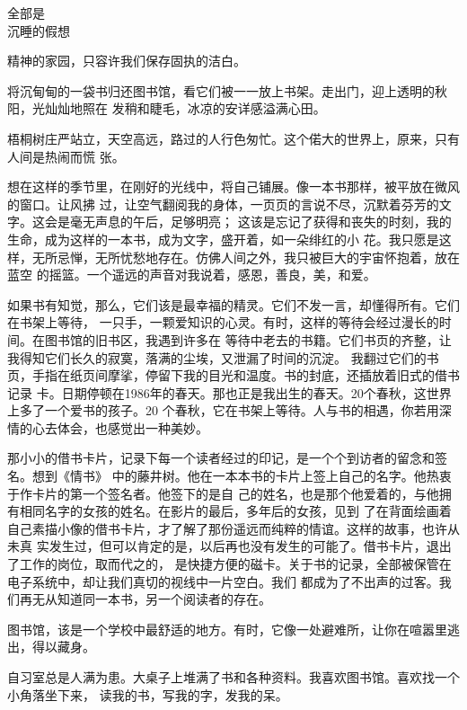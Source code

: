 		全部是 \\
		沉睡的假想

	\endlongpoem
	\endwriting



		精神的家园，只容许我们保存固执的洁白。

		将沉甸甸的一袋书归还图书馆，看它们被一一放上书架。走出门，迎上透明的秋阳，光灿灿地照在
	发稍和睫毛，冰凉的安详感溢满心田。

		梧桐树庄严站立，天空高远，路过的人行色匆忙。这个偌大的世界上，原来，只有人间是热闹而慌
	张。

		想在这样的季节里，在刚好的光线中，将自己铺展。像一本书那样，被平放在微风的窗口。让风拂
	过，让空气翻阅我的身体，一页页的言说不尽，沉默着芬芳的文字。这会是毫无声息的午后，足够明亮；
	这该是忘记了获得和丧失的时刻，我的生命，成为这样的一本书，成为文字，盛开着，如一朵绯红的小
	花。我只愿是这样，无所忌惮，无所忧愁地存在。仿佛人间之外，我只被巨大的宇宙怀抱着，放在蓝空
	的摇篮。一个遥远的声音对我说着，感恩，善良，美，和爱。

		如果书有知觉，那么，它们该是最幸福的精灵。它们不发一言，却懂得所有。它们在书架上等待，
	一只手，一颗爱知识的心灵。有时，这样的等待会经过漫长的时间。在图书馆的旧书区，我遇到许多在
	等待中老去的书籍。它们书页的齐整，让我得知它们长久的寂寞，落满的尘埃，又泄漏了时间的沉淀。
	我翻过它们的书页，手指在纸页间摩挲，停留下我的目光和温度。书的封底，还插放着旧式的借书记录
	卡。日期停顿在1986年的春天。那也正是我出生的春天。20个春秋，这世界上多了一个爱书的孩子。20
	个春秋，它在书架上等待。人与书的相遇，你若用深情的心去体会，也感觉出一种美妙。

		那小小的借书卡片，记录下每一个读者经过的印记，是一个个到访者的留念和签名。想到《情书》
	中的藤井树。他在一本本书的卡片上签上自己的名字。他热衷于作卡片的第一个签名者。他签下的是自
	己的姓名，也是那个他爱着的，与他拥有相同名字的女孩的姓名。在影片的最后，多年后的女孩，见到
	了在背面绘画着自己素描小像的借书卡片，才了解了那份遥远而纯粹的情谊。这样的故事，也许从未真
	实发生过，但可以肯定的是，以后再也没有发生的可能了。借书卡片，退出了工作的岗位，取而代之的，
	是快捷方便的磁卡。关于书的记录，全部被保管在电子系统中，却让我们真切的视线中一片空白。我们
	都成为了不出声的过客。我们再无从知道同一本书，另一个阅读者的存在。

		图书馆，该是一个学校中最舒适的地方。有时，它像一处避难所，让你在喧嚣里逃出，得以藏身。

		自习室总是人满为患。大桌子上堆满了书和各种资料。我喜欢图书馆。喜欢找一个小角落坐下来，
	读我的书，写我的字，发我的呆。

